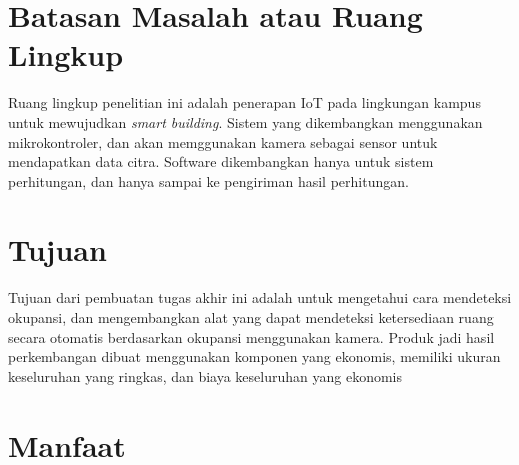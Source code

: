 \section{Batasan Masalah atau Ruang Lingkup}

Ruang lingkup penelitian ini adalah penerapan IoT pada lingkungan kampus untuk mewujudkan {\it smart building}. Sistem yang dikembangkan menggunakan mikrokontroler, dan akan memggunakan kamera sebagai sensor untuk mendapatkan data citra.
Software dikembangkan hanya untuk sistem perhitungan, dan hanya sampai ke pengiriman hasil perhitungan.

\section{Tujuan}

Tujuan dari pembuatan tugas akhir ini adalah untuk mengetahui cara mendeteksi okupansi, dan mengembangkan alat yang dapat mendeteksi ketersediaan ruang secara otomatis berdasarkan okupansi menggunakan kamera. Produk jadi hasil perkembangan dibuat menggunakan komponen yang ekonomis, memiliki ukuran keseluruhan yang ringkas, dan  biaya keseluruhan yang ekonomis

\section{Manfaat}

